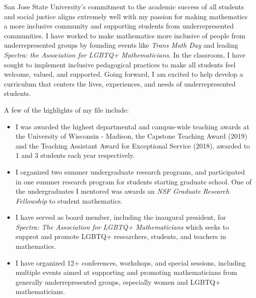 \documentclass[11pt]{article}
\begin{document}
San Jose State University’s commitment to the academic success of all students and social justice aligns extremely well with my passion for making mathematics a more inclusive community and supporting students from underrepresented communities. I have worked to make mathematics more inclusive of people from underrepresented groups by founding events like \textit{Trans Math Day} and leading \textit{Spectra: the Association for LGBTQ+ Mathematicians}.  In the classroom, I have sought to implement inclusive pedagogical practices to make all students feel welcome, valued, and supported. Going forward, I am excited to help develop a curriculum that centers the lives, experiences, and needs of underrepresented students. 

A few of the highlights of my file include:

\begin{itemize}[leftmargin=*]
\item I was awarded the highest departmental and campus-wide teaching awards at the University of Wisconsin - Madison, the Capstone Teaching Award (2019) and the Teaching Assistant Award for Exceptional Service (2018), awarded to 1 and 3 students each year respectively. 
\item I organized two summer undergraduate research programs, and participated in one summer research program for students starting graduate school. One of the undergraduates I mentored was awards an \textit{NSF Graduate Research Fellowship} to student mathematics.  
\item I have served as board member, including the inaugural president, for \textit{Spectra: The Association for LGBTQ+ Mathematicians} which seeks to supprot and promote LGBTQ+ researchers, students, and teachers in mathematics. 
\item I have organized 12+ conferences, workshops, and special sessions, including multiple events aimed at supporting and promoting mathematicians from generally underrepresented groups, especially women and LGBTQ+ mathematicians. 
\end{itemize}
\end{document}
